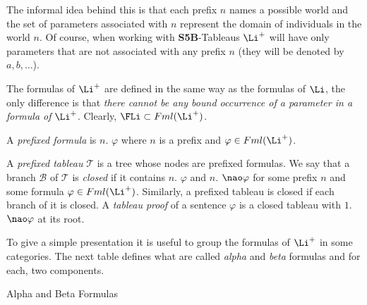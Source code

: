 \qquad The informal idea behind this is that each prefix $n$ names a possible world and the set of parameters associated with $n$ represent the domain of individuals in the world $n$. Of course, when working with \textbf{S5B}-Tableaus $\Li^{+}$ will have only parameters that are not associated with any prefix $n$ (they will be denoted by $a, b, \dots$). 

\qquad The formulas of $\Li^{+}$  are defined in the same way as the formulas of $\Li$, the only difference is that \textit{there cannot be any bound occurrence of a parameter in a formula of} $\Li^{+}$. Clearly, $\FLi \subset Fml(\Li^{+})$.

\begin{defn}
A \textit{prefixed formula} is $n.$  $\varphi$ where $n$ is a prefix and $\varphi \in  Fml(\Li^{+})$.
\end{defn}

\begin{defn}
A \textit{prefixed tableau} $\mathcal{T}$ is a tree whose nodes are prefixed formulas. We say that a branch $\mathcal{B}$ of $\mathcal{T}$ is \textit{closed} if it contains $n.$ $\varphi$ and $n.$ $\nao \varphi$ for some prefix $n$ and some formula $\varphi \in  Fml(\Li^{+})$. Similarly, a prefixed tableau is closed if each branch of it is closed. A \textit{tableau proof} of a sentence $\varphi$ is a closed tableau with $1.$ $\nao \varphi$ at its root.
\end{defn}

\qquad To give a simple presentation it is useful to group the formulas of $\Li^{+}$  in some categories. The next table defines what are called \textit{alpha} and \textit{beta} formulas and for each, two components. 

\begin{center}
Alpha and Beta Formulas
\end{center}

